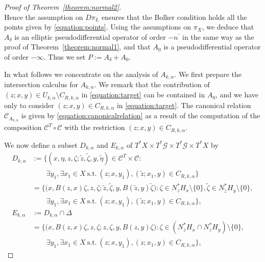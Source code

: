 \documentclass[a4paper,11pt,reqno]{amsart}
\theoremstyle{definition}
\theoremstyle{remark}
\begin{document}
\begin{proof}[Proof of Theorem~\ref{theorem:normal2}]
\begin{equation}
\label{equation:points}
\end{equation}
%
% 
Hence the assumption on $D\pi_L$ ensures 
that the Bolker condition holds all the points given by \eqref{equation:points}. 
Using the assumptions on $\pi_X$, 
we deduce that $A_\delta$ is an elliptic pseudodifferential operator of order $-n^\prime$ in the same way as the proof of Theorem~\ref{theorem:normal1}, 
and that $A_0$ is a pseudodifferential operator of order $-\infty$. 
Thus we set $P:=A_\delta+A_0$. 
%
%
\par
%
%
In what follows we concentrate on the analysis of $A_{k,\alpha}$. 
We first prepare the intersection calculus for $A_{k,\alpha}$. 
We remark that the contribution of $(z;x,y) \in U_{k,\alpha}\setminus{C_{R,k,\alpha}}$ 
in \eqref{equation:target} can be contained in $A_0$, and we have only to consider 
$(z;x,y) \in C_{R,k,\alpha}$ in \eqref{equation:target}. 
The canonical relation $\mathcal{C}_{A_{k,\alpha}}$ is given by 
\eqref{equation:canonicalrelation} as a result of the computation of the composition 
$\mathcal{C}^T\circ\mathcal{C}$ with the restriction $(z;x,y) \in C_{R,k,\alpha}$.  
%
%
\par
%
%
We now define a subset $D_{k,\alpha}$ and $E_{k,\alpha}$ of 
$T^\ast{X}{\times}T^\ast\mathcal{G}{\times}T^\ast\mathcal{G}{\times}T^\ast{X}$ by 
%
%
\begin{align}
  D_{k,\alpha}
& :=
  \{(x,\eta,z,\zeta;\tilde{z},\tilde{\zeta},y,\tilde{\eta})
  \in \mathcal{C}^T \times \mathcal{C}
  : 
\nonumber
\\
& \qquad
  \exists y_1, \exists x_1 \in X
  \ \text{s.t.}\ 
  (z;x,y_1), (\tilde{z};x_1,y) \in C_{R,k,\alpha}
  \} 
\nonumber
\\
& =
  \bigl\{
  \bigl(x,B(z,x)\zeta,z,\zeta;\tilde{z},\tilde{\zeta},y,B(\tilde{z},y)\tilde{\zeta}\bigr)
  :
  \zeta \in N^\ast_zH_x\setminus\{0\}, \tilde{\zeta} \in N^\ast_{\tilde{z}}H_y\setminus\{0\},
\nonumber
\\
& \qquad
  \exists y_1, \exists x_1 \in X
  \ \text{s.t.}\ 
  (z;x,y_1), (\tilde{z};x_1,y) \in C_{R,k,\alpha}
  \bigr\}, 
\nonumber
\\
  E_{k,\alpha}
& :=
  D_{k,\alpha}\cap\Delta
\nonumber
\\
& =
  \bigl\{
  \bigl(x,B(z,x)\zeta,z,\zeta;z,\zeta,y,B(z,y)\zeta\bigr)
  :
  \zeta \in (N^\ast_zH_x{\cap}N^\ast_zH_y)\setminus\{0\},
\nonumber
\\
& \qquad
  \exists y_1, \exists x_1 \in X
  \ \text{s.t.}\ 
  (z;x,y_1), (z;x_1,y) \in C_{R,k,\alpha}
  \bigr\}, 
\label{equation:delta}

\end{align}
\end{proof}
\end{document}
